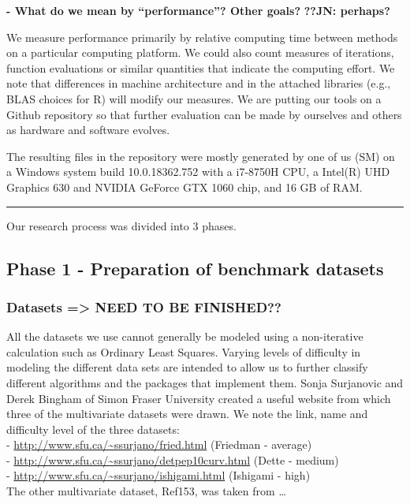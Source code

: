 \textbf{- What do we mean by ``performance''? Other goals?}
\textbf{??JN: perhaps?}

We measure performance primarily by relative computing time between
methods on a particular computing platform. We could also count measures
of iterations, function evaluations or similar quantities that indicate
the computing effort. We note that differences in machine architecture
and in the attached libraries (e.g., BLAS choices for R) will modify our
measures. We are putting our tools on a Github repository so that
further evaluation can be made by ourselves and others as hardware and
software evolves.

The resulting files in the repository were mostly generated by one of us
(SM) on a Windows system build 10.0.18362.752 with a i7-8750H CPU, a
Intel(R) UHD Graphics 630 and NVIDIA GeForce GTX 1060 chip, and 16 GB of
RAM.

\begin{center}\rule{0.5\linewidth}{0.5pt}\end{center}

Our research process was divided into 3 phases.

\hypertarget{phase-1---preparation-of-benchmark-datasets}{%
\subsection{Phase 1 - Preparation of benchmark
datasets}\label{phase-1---preparation-of-benchmark-datasets}}

\hypertarget{datasets-need-to-be-finished}{%
\subsubsection{Datasets =\textgreater{} NEED TO BE
FINISHED??}\label{datasets-need-to-be-finished}}

All the datasets we use cannot generally be modeled using a
non-iterative calculation such as Ordinary Least Squares. Varying levels
of difficulty in modeling the different data sets are intended to allow
us to further classify different algorithms and the packages that
implement them. Sonja Surjanovic and Derek Bingham of Simon Fraser
University created a useful website from which three of the multivariate
datasets were drawn. We note the link, name and difficulty level of the
three datasets:\\
- \url{http://www.sfu.ca/~ssurjano/fried.html} (Friedman - average)\\
- \url{http://www.sfu.ca/~ssurjano/detpep10curv.html} (Dette - medium)\\
- \url{http://www.sfu.ca/~ssurjano/ishigami.html} (Ishigami - high)\\
The other multivariate dataset, Ref153, was taken from \ldots{}

